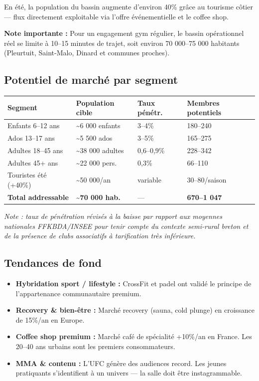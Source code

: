 \documentclass[11pt, a4paper]{article}
\begin{document}
En été, la population du bassin augmente d'environ 40\% grâce au tourisme côtier — flux directement exploitable via l'offre événementielle et le coffee shop.

\textbf{Note importante :} Pour un engagement gym régulier, le bassin opérationnel réel se limite à 10–15 minutes de trajet, soit environ 70 000–75 000 habitants (Pleurtuit, Saint-Malo, Dinard et communes proches).

\subsection{Potentiel de marché par segment}

\begin{center}
\begin{tabular}{@{}p{5cm}p{3.5cm}p{2.2cm}p{2.5cm}@{}}
\toprule
\rowcolor{fc-ink}\color{white}\textbf{Segment} & \color{white}\textbf{Population cible} & \color{white}\textbf{Taux pénétr.} & \color{white}\textbf{Membres potentiels} \\
\midrule
Enfants 6–12 ans & \textasciitilde6 000 enfants & 3–4\% & 180–240 \\
\rowcolor{fc-bg2} Ados 13–17 ans & \textasciitilde5 500 ados & 3–5\% & 165–275 \\
Adultes 18–45 ans & \textasciitilde38 000 adultes & 0,6–0,9\% & 228–342 \\
\rowcolor{fc-bg2} Adultes 45+ ans & \textasciitilde22 000 pers. & 0,3\% & 66–110 \\
Touristes été (+40\%) & \textasciitilde50 000/an & variable & 30–80/saison \\
\midrule
\textbf{Total addressable} & \textbf{\textasciitilde70 000 hab.} & — & \textbf{670–1 047} \\
\bottomrule
\end{tabular}
\end{center}

\vspace{6pt}
{\small\color{fc-ink3}\textit{Note : taux de pénétration révisés à la baisse par rapport aux moyennes nationales FFKBDA/INSEE pour tenir compte du contexte semi-rural breton et de la présence de clubs associatifs à tarification très inférieure.}}

\subsection{Tendances de fond}

\begin{itemize}
  \item \textbf{Hybridation sport / lifestyle :} CrossFit et padel ont validé le principe de l'appartenance communautaire premium.
  \item \textbf{Recovery \& bien-être :} Marché recovery (sauna, cold plunge) en croissance de 15\%/an en Europe.
  \item \textbf{Coffee shop premium :} Marché café de spécialité +10\%/an en France. Les 20–40 ans urbains sont les premiers consommateurs.
  \item \textbf{MMA \& contenu :} L'UFC génère des audiences record. Les jeunes pratiquants s'identifient à un univers — la salle doit être instagrammable.
\end{itemize}
\end{document}
